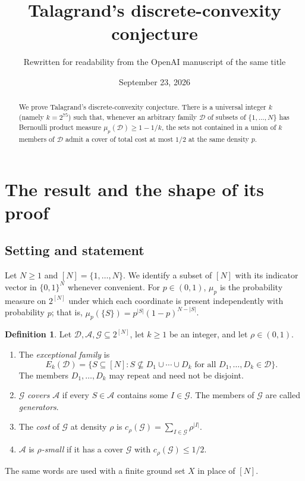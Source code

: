 \documentclass[11pt,letterpaper]{article}
\title{Talagrand's discrete-convexity conjecture}
\author{Rewritten for readability from the OpenAI manuscript of the same title}
\date{September 23, 2026}
\theoremstyle{definition}
\newtheorem{definition}[theorem]{Definition}
\theoremstyle{remark}
\numberwithin{equation}{section}
\begin{document}
\maketitle
\begin{abstract}
We prove Talagrand's discrete-convexity conjecture.
There is a universal integer $k$ (namely $k=2^{75}$) such that, whenever an
arbitrary family $\mathcal D$ of subsets of $\{1,\ldots,N\}$ has Bernoulli
product measure $\mu_p(\mathcal D)\ge 1-1/k$, the sets not contained in a
union of $k$ members of $\mathcal D$ admit a cover of total cost at most
$1/2$ at the same density $p$.
\end{abstract}

\section{The result and the shape of its proof}
\label{sec:introduction}

\subsection{Setting and statement}

Let $N\ge1$ and $[N]=\{1,\ldots,N\}$. We identify a subset of $[N]$ with its
indicator vector in $\{0,1\}^N$ whenever convenient. For $p\in(0,1)$,
$\mu_p$ is the probability measure on $2^{[N]}$ under which each coordinate
is present independently with probability $p$; that is,
$\mu_p(\{S\})=p^{|S|}(1-p)^{N-|S|}$.

\begin{definition}\label{def:basic}
Let $\mathcal D,\mathcal A,\mathcal G\subseteq 2^{[N]}$, let $k\ge1$ be an
integer, and let $\rho\in(0,1)$.
\begin{enumerate}[label=(\alph*)]
\item The \emph{exceptional family} is
\begin{equation}
\label{eq:exceptional-definition}
E_k(\mathcal D)
=\bigl\{S\subseteq[N]:
  S\nsubseteq D_1\cup\cdots\cup D_k
  \text{ for all }D_1,\ldots,D_k\in\mathcal D\bigr\}.
\end{equation}
The members $D_1,\ldots,D_k$ may repeat and need not be disjoint.
\item $\mathcal G$ \emph{covers} $\mathcal A$ if every $S\in\mathcal A$
contains some $I\in\mathcal G$. The members of $\mathcal G$ are called
\emph{generators}.
\item The \emph{cost} of $\mathcal G$ at density $\rho$ is
$c_\rho(\mathcal G)=\sum_{I\in\mathcal G}\rho^{|I|}$.
\item $\mathcal A$ is \emph{$\rho$-small} if it has a cover $\mathcal G$
with $c_\rho(\mathcal G)\le 1/2$.
\end{enumerate}
The same words are used with a finite ground set $X$ in place of $[N]$.
\end{definition}
\end{document}
